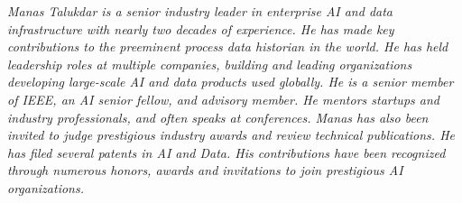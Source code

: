 {\selectfont
	\begin{justify}\textit{Manas Talukdar is a senior industry leader in enterprise AI and data infrastructure with nearly two decades of experience. He has made key contributions to the preeminent process data historian in the world. He has held leadership roles at multiple companies, building and leading organizations developing large-scale AI and data products used globally. He is a senior member of IEEE, an AI senior fellow, and advisory member. He mentors startups and industry professionals, and often speaks at conferences. Manas has also been invited to judge prestigious industry awards and review technical publications. He has filed several patents in AI and Data. His contributions have been recognized through numerous honors, awards and invitations to join prestigious AI organizations.}\end{justify}
}
\vspace{-12pt}